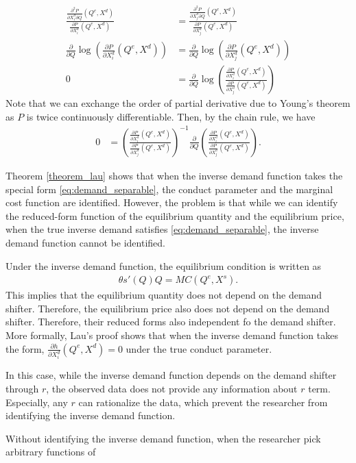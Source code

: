 \documentclass[11pt, a4paper]{article}
\theoremstyle{remark}
\begin{document}
\begin{align}
    \frac{\frac{\partial^2 P}{\partial X^{d}_{i} \partial Q}(Q^e, X^{d})}{\frac{\partial P}{\partial X^{d}_{i}}(Q^e, X^{d})}  & = \frac{\frac{\partial^2 P}{\partial X^{d}_{j} \partial Q}(Q^e, X^{d})}{\frac{\partial P}{\partial X^{d}_{j}}(Q^e, X^{d})}\\ 
    \frac{\partial }{\partial Q} \log\left( \frac{\partial P}{\partial X^{d}_{i}}(Q^e, X^{d})\right) &= \frac{\partial }{\partial Q} \log\left( \frac{\partial P}{\partial X^{d}_{j}}(Q^e, X^{d})\right)\\
    0& = \frac{\partial}{\partial Q}\log\left(\frac{\frac{\partial P}{\partial X^{d}_{i}}(Q^e, X^{d})}{\frac{\partial P}{\partial X^{d}_{j}}(Q^e, X^{d})}\right)
\end{align}
Note that we can exchange the order of partial derivative due to Young's theorem as $P$ is twice continuously differentiable.
Then, by the chain rule, we have
\begin{align}
    0 & = \left(\frac{\frac{\partial P}{\partial X^{d}_{i}}(Q^e, X^{d})}{\frac{\partial P}{\partial X^{d}_{j}}(Q^e, X^{d})}\right)^{-1} \frac{\partial}{\partial Q} \left(\frac{\frac{\partial P}{\partial X^{d}_{i}}(Q^e, X^{d})}{\frac{\partial P}{\partial X^{d}_{j}}(Q^e, X^{d})}\right).
\end{align}




Theorem \ref{theorem_lau} shows that when the inverse demand function takes the special form \eqref{eq:demand_separable}, the conduct parameter and the marginal cost function are identified.
However, the problem is that while we can identify the reduced-form function of the equilibrium quantity and the equilibrium price, when the true inverse demand satisfies \eqref{eq:demand_separable}, the inverse demand function cannot be identified.

Under the inverse demand function, the equilibrium condition is written as
\begin{align}
    \theta s'(Q)Q = MC(Q^e, X^{s}).
\end{align}
This implies that the equilibrium quantity does not depend on the demand shifter.
Therefore, the equilibrium price also does not depend on the demand shifter.
Therefore, their reduced forms also independent fo the demand shifter.
More formally, Lau's proof shows that when the inverse demand function takes the form, $\frac{\partial h}{\partial X_i^{d}}(Q^e, X^{d}) = 0$ under the true conduct parameter. 





In this case, while the inverse demand function depends on the demand shifter through $r$, the observed data does not provide any information about $r$ term.
Especially, any $r$ can rationalize the data, which prevent the researcher from identifying the inverse demand function.

Without identifying the inverse demand function, when the researcher pick arbitrary functions of 
\end{document}
